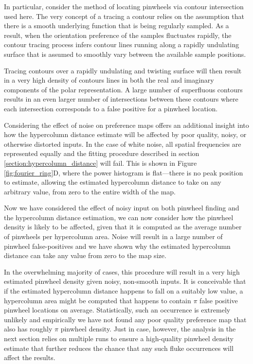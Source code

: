 \documentclass[phd,ianc,twoside]{infthesis}
\begin{document}
In particular, consider the method of locating pinwheels via contour
intersection \citep{lowel_ejn98} used here. The very concept of a
tracing a contour relies on the assumption that there is a smooth
underlying function that is being regularly sampled. As a result, when
the orientation preference of the samples fluctuates rapidly, the
contour tracing process infers contour lines running along a rapidly
undulating surface that is assumed to smoothly vary between the
available sample positions.

Tracing contours over a rapidly undulating and twisting surface will
then result in a very high density of contours lines in both the real
and imaginary components of the polar representation. A large number of
superfluous contours results in an even larger number of intersections
between these contours where each intersection corresponds to a
false positive for a pinwheel location.

Considering the effect of noise on preference maps offers an additional
insight into how the hypercolumn distance estimate will be affected
by poor quality, noisy, or otherwise distorted inputs. In the case of
white noise, all spatial frequencies are represented equally and the
fitting procedure described in section
\ref{section:hypercolumn_distance} will fail. This is shown in Figure
\ref{fig:fourier_ring}D, where the power histogram is flat---there is
no peak position to estimate, allowing the estimated 
hypercolumn distance to take on any arbitrary value, from zero to the
entire width of the map.

Now we have considered the effect of noisy input on both pinwheel
finding and the hypercolumn distance estimation, we can now consider how
the pinwheel density is likely to be affected, given that it is computed
as the average number of pinwheels per hypercolumn area. Noise will
result in a large number of pinwheel false-positives and we have shown
why the estimated hypercolumn distance can take any value from zero to
the map size.

In the overwhelming majority of cases, this procedure will result in a very high
estimated pinwheel density given noisy, non-smooth inputs. It is conceivable that
if the estimated hypercolumn distance happens to fall on a suitably
low value, a hypercolumn area might be computed that happens to contain
$\pi$ false positive pinwheel locations on average. Statistically, such
an occurrence is extremely unlikely and empirically we have not found any
poor quality preference map that also has roughly $\pi$ pinwheel
density. Just in case, however, the analysis in the next section relies on
multiple runs to ensure a high-quality pinwheel density estimate that
further reduces the chance that any such fluke occurrences will affect the
results.
\end{document}
